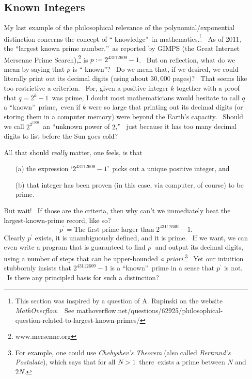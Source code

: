 \documentclass[12pt,onecolumn]{article}%
\begin{document}
\subsection{Known Integers\label{INTEGERS}}

My last example of the philosophical relevance of the polynomial/exponential
distinction concerns the concept of \textquotedblleft
knowledge\textquotedblright\ in mathematics.\footnote{This section was
inspired by a question of A. Rupinski on the website \textit{MathOverflow}.
\ See
mathoverflow.net/questions/62925/philosophical-question-related-to-largest-known-primes/}
\ As of 2011, the \textquotedblleft largest known prime
number,\textquotedblright\ as reported by GIMPS (the Great Internet Mersenne
Prime Search),\footnote{www.mersenne.org} is $p:=2^{43112609}-1$. \ But on
reflection, what do we mean by saying that $p$ is \textquotedblleft
known\textquotedblright? \ Do we mean that, if we desired, we could literally
print out its decimal digits (using about $30,000$ pages)? \ That seems like
too restrictive a criterion. \ For, given a positive integer $k$ together with
a proof that $q=2^{k}-1$\ was prime, I doubt most mathematicians would
hesitate to call $q$ a \textquotedblleft known\textquotedblright\ prime,\ even
if $k$ were so large that printing out its decimal digits (or storing them in
a computer memory) were beyond the Earth's capacity. \ Should we call
$2^{2^{1000}}$\ an \textquotedblleft unknown power of $2$,\textquotedblright%
\ just because it has too many decimal digits to list before the Sun goes cold?

All that should \textit{really} matter, one feels, is that

\begin{enumerate}
\item[(a)] the expression `$2^{43112609}-1$'\ picks out a unique positive
integer, and

\item[(b)] that integer has been proven (in this case, via computer, of
course) to be prime.
\end{enumerate}

But wait! \ If those are the criteria, then why can't we immediately beat the
largest-known-prime record, like so?%
\[
p^{\prime}=\text{The first prime larger than }2^{43112609}-1.
\]
Clearly $p^{\prime}$ exists, it is unambiguously defined, and it is prime.
\ If we want, we can even write a program that is guaranteed to find
$p^{\prime}$ and output its decimal digits, using a number of steps that can
be upper-bounded \textit{a priori}.\footnote{For example, one could use
\textit{Chebyshev's Theorem} (also called \textit{Bertrand's Postulate}),
which says that for all $N>1$\ there\ exists a prime between $N$ and $2N$.}
\ Yet our intuition stubbornly insists that $2^{43112609}-1$ is a
\textquotedblleft known\textquotedblright\ prime in a sense that $p^{\prime}$
is not. \ Is there any principled basis for such a distinction?
\end{document}
